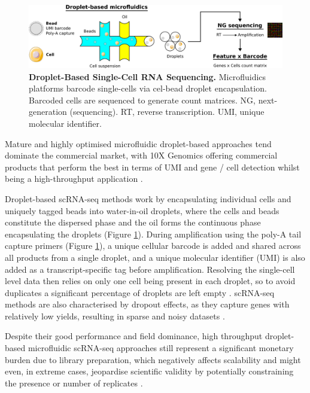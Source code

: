 \begin{figure}[H]
    \centering
    \includegraphics{01intro/figs/1TECH_scRNAseq.png}
    \caption{\textbf{Droplet-Based Single-Cell RNA Sequencing.} Microfluidics platforms barcode single-cells via cel-bead droplet encapsulation. Barcoded cells are sequenced to generate count matrices. NG, next-generation (sequencing). RT, reverse transcription. UMI, unique molecular identifier.}
    \label{fig:1tech}
\end{figure}

Mature and highly optimised microfluidic droplet-based approaches tend dominate the commercial market, with 10X Genomics offering commercial products \cite{kitzman_haplotypes_2016} that perform the best in terms of UMI and gene / cell detection whilst being a high-throughput application \cite{ding_systematic_2020}.

Droplet-based scRNA-seq methods work by encapsulating individual cells and uniquely tagged beads into water-in-oil droplets, where the cells and beads constitute the dispersed phase and the oil forms the continuous phase encapsulating the droplets \cite{macosko_highly_2015} (Figure \ref{fig:1tech}). During amplification using the poly-A tail capture primers (Figure \ref{fig:1tech}), a unique cellular barcode is added and shared across all products from a single droplet, and a unique molecular identifier (UMI) is also added as a transcript-specific tag before amplification.
Resolving the single-cell level data then relies on only one cell being present in each droplet, so to avoid duplicates a significant percentage of droplets are left empty \cite{abate_beating_2009}. scRNA-seq methods are also characterised by dropout effects, as they capture genes with relatively low yields, resulting in sparse and noisy datasets \cite{qiu_embracing_2020}. 

Despite their good performance and field dominance, high throughput droplet-based microfluidic scRNA-seq approaches still represent a significant monetary burden due to library preparation, which negatively affects scalability and might even, in extreme cases, jeopardise scientific validity by potentially constraining the presence or number of replicates \cite{zimmerman_practical_2021}.

